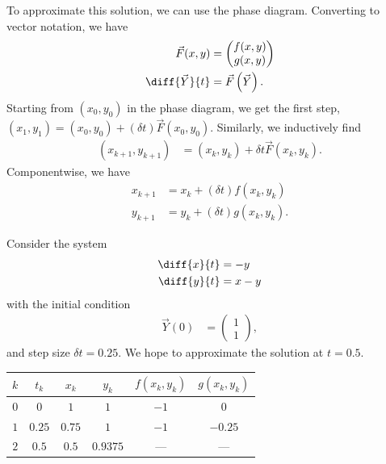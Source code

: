 \documentclass[10pt]{mypackage}
\begin{document}
To approximate this solution, we can use the phase diagram. Converting to vector notation, we have
\begin{align*}
  \vec{F}(x,y) &= \begin{pmatrix}f(x,y)\\g(x,y)\end{pmatrix}\\
  \diff{\vec{Y}}{t} &= \vec{F}\left(\vec{Y}\right).
\end{align*}
Starting from $\left(x_0,y_0\right)$ in the phase diagram, we get the first step, $\left(x_1,y_1\right) = \left(x_0 ,y_0\right) + \left(\delta t\right) \vec{F}\left(x_0,y_0\right)$. Similarly, we inductively find
\begin{align*}
  \left(x_{k+1},y_{k+1}\right) &= \left(x_k,y_k\right) + \delta t \vec{F}\left(x_k,y_k\right).
\end{align*}
Componentwise, we have
\begin{align*}
  x_{k+1} &= x_k + \left(\delta t\right)f\left(x_k,y_k\right)\\
  y_{k+1} &= y_k + \left(\delta t\right) g\left(x_k,y_k\right).
\end{align*}
\begin{example}
  Consider the system
  \begin{align*}
    \diff{x}{t} &= -y\\
    \diff{y}{t} &= x-y
  \end{align*}
  with the initial condition 
  \begin{align*}
    \vec{Y}(0) &= \begin{pmatrix}1\\1\end{pmatrix},
  \end{align*}
  and step size $\delta t = 0.25$. We hope to approximate the solution at $t = 0.5$.
  \begin{center}
    \begin{tabular}{c|c|c|c|c|c}
      $k$ & $t_k$ & $x_k$ & $y_k$ & $f\left(x_k,y_k\right)$ & $g\left(x_k,y_k\right)$\\
      \hline
      $0$ & $0$ & $1$ & $1$ & $-1$ & $0$\\
      $1$ & $0.25$ & $0.75$ & $1$ & $-1$ & $-0.25$\\
      $2$ & $0.5$ & $0.5$ & $0.9375$ & --- & ---
    \end{tabular}
  \end{center}
\end{example}
\end{document}
